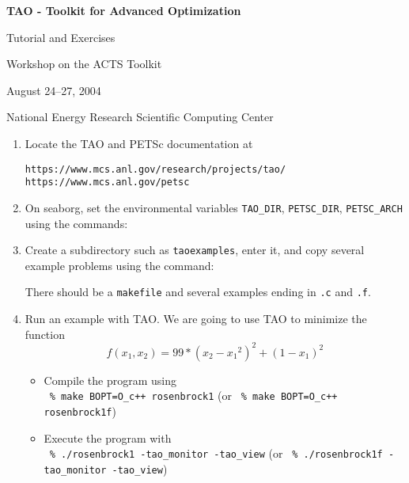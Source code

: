 \documentclass[11pt]{article}
\begin{document}
\begin{center}
{\bf
TAO - Toolkit for Advanced Optimization
        
Tutorial and Exercises

\vspace{0.25in}

Workshop on the ACTS Toolkit

August 24--27, 2004

National Energy Research Scientific Computing Center
}
\end{center}
\vspace{0.25in}

\begin{enumerate}

\item Locate the TAO and PETSc documentation at 
\begin{alltt}
https://www.mcs.anl.gov/research/projects/tao/
https://www.mcs.anl.gov/petsc
\end{alltt}

\item On seaborg, set the environmental variables
\texttt{TAO\_DIR}, \texttt{PETSC\_DIR}, \texttt{PETSC\_ARCH} 
using the commands:
\begin{alltt}
% module load tao/1.7
% module load petsc/2.2.1
\end{alltt}

\item Create a subdirectory such as \texttt{taoexamples}, enter it, and copy several example problems using the
command:
\begin{alltt}
% mkdir taoexamples
% cd taoexamples
% cp -R \$TAO_DIR/src/unconstrained/examples/tutorials/* .
% ls
\end{alltt}
There should be a \texttt{makefile} and several examples ending in \texttt{.c} and \texttt{.f}.

\item Run an example with TAO.
We are going to use TAO to minimize the function 
\[
    f(x_1,x_2) = 99*(x_2-{x_1}^2)^2 + (1-x_1)^2 
\]

\begin{itemize}

 \item Compile the program using \\
  \quad \texttt{ \% make BOPT=O\_c++ rosenbrock1} 
  (or \texttt{ \% make BOPT=O\_c++ rosenbrock1f})

 \item Execute the program with \\
  \quad \texttt{ \% ./rosenbrock1 -tao\_monitor -tao\_view} (or
  \texttt{ \% ./rosenbrock1f -tao\_monitor -tao\_view})


\end{itemize}
\end{enumerate}
\end{document}
